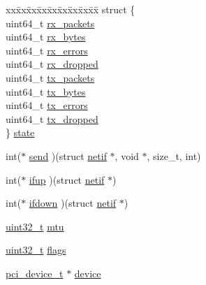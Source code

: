 \begin{DoxyCompactItemize}
\begin{tabbing}
\end{tabbing}\item 
\begin{tabbing}
xx\=xx\=xx\=xx\=xx\=xx\=xx\=xx\=xx\=\kill
struct \{\\
\>uint64\_t \hyperlink{structnetif_a80040f58867713ff1b5ec982a450221e}{rx\_packets}\\
\>uint64\_t \hyperlink{structnetif_a5a078449e22bb6f4d3d0068345d8dabc}{rx\_bytes}\\
\>uint64\_t \hyperlink{structnetif_adb3c694759403e67d539a5e81a552c92}{rx\_errors}\\
\>uint64\_t \hyperlink{structnetif_a1fc7320d2883ee21c7fe0fd954a70887}{rx\_dropped}\\
\>uint64\_t \hyperlink{structnetif_aabafd7c28253a190863f673bd5e4320a}{tx\_packets}\\
\>uint64\_t \hyperlink{structnetif_ac340647ad948b8103aa9a4e3c7b3fd0f}{tx\_bytes}\\
\>uint64\_t \hyperlink{structnetif_adac4c9e26ac4c17089eaf3a0e060f601}{tx\_errors}\\
\>uint64\_t \hyperlink{structnetif_a7793287254eb992df0174122a81654d0}{tx\_dropped}\\
\} \hyperlink{structnetif_a5ae2198374cbfd44de7e41e646aaae64}{state}\\

\end{tabbing}\item 
int($\ast$ \hyperlink{structnetif_ac0505ae55088f68c2cefa77dc6871208}{send} )(struct \hyperlink{structnetif}{netif} $\ast$, void $\ast$, size\+\_\+t, int)
\item 
int($\ast$ \hyperlink{structnetif_a70984b0d611d5a941aecabbc98f62467}{ifup} )(struct \hyperlink{structnetif}{netif} $\ast$)
\item 
int($\ast$ \hyperlink{structnetif_a73d7967fecfead19c8ae2a39a8cbf112}{ifdown} )(struct \hyperlink{structnetif}{netif} $\ast$)
\item 
\hyperlink{aplus_8h_a53a0df51603c77c2aa5b9ea61b606a82}{uint32\+\_\+t} \hyperlink{structnetif_a2eb32b1acf0a223c5cc3874da3c2f3df}{mtu}
\item 
\hyperlink{aplus_8h_a53a0df51603c77c2aa5b9ea61b606a82}{uint32\+\_\+t} \hyperlink{structnetif_a07586ae7a31c1231781af7394ce41659}{flags}
\item 
\hyperlink{pci_8h_ab3c98ba0de1f963ef2f46200b090815b}{pci\+\_\+device\+\_\+t} $\ast$ \hyperlink{structnetif_a8d0c9464b5010487798a5ea8adce5a39}{device}
\end{DoxyCompactItemize}



